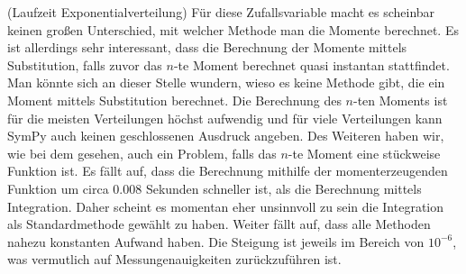 \begin{Beispiel}{(Laufzeit Exponentialverteilung)}
Für diese Zufallsvariable macht es scheinbar keinen großen Unterschied, mit welcher Methode man die Momente berechnet. Es ist allerdings sehr interessant, dass die Berechnung der Momente mittels Substitution, falls zuvor das $n$-te Moment berechnet quasi instantan stattfindet. Man könnte sich an dieser Stelle wundern, wieso es keine Methode gibt, die ein Moment mittels Substitution berechnet. Die Berechnung des $n$-ten Moments ist für die meisten Verteilungen höchst aufwendig und für viele Verteilungen kann SymPy auch keinen geschlossenen Ausdruck angeben. Des Weiteren haben wir, wie bei dem \hyperlink{Bsp:Nicht-Int}{} gesehen, auch ein Problem, falls das $n$-te Moment eine stückweise Funktion ist. Es fällt auf, dass die Berechnung mithilfe der momenterzeugenden Funktion um circa $0.008$ Sekunden schneller ist, als die Berechnung mittels Integration. Daher scheint es momentan eher unsinnvoll zu sein die Integration als Standardmethode gewählt zu haben. Weiter fällt auf, dass alle Methoden nahezu konstanten Aufwand haben. Die Steigung ist jeweils im Bereich von $10^{-6}$, was vermutlich auf Messungenauigkeiten zurückzuführen ist.
\end{Beispiel}

\vspace*{-\medskipamount}

\newpage

